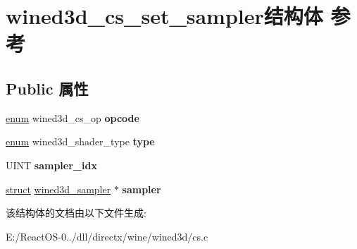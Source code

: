 \hypertarget{structwined3d__cs__set__sampler}{}\section{wined3d\+\_\+cs\+\_\+set\+\_\+sampler结构体 参考}
\label{structwined3d__cs__set__sampler}
\subsection*{Public 属性}
\begin{DoxyCompactItemize}
\item 
\mbox{\label{structwined3d__cs__set__sampler_aac800a9a600d52e8db6c5b51700b7a91}} 
\hyperlink{interfaceenum}{enum} wined3d\+\_\+cs\+\_\+op {\bfseries opcode}
\item 
\mbox{\label{structwined3d__cs__set__sampler_a1b6f90a5a6bad32c24e757a2b2ae310f}} 
\hyperlink{interfaceenum}{enum} wined3d\+\_\+shader\+\_\+type {\bfseries type}
\item 
\mbox{\label{structwined3d__cs__set__sampler_a8a703f062e1ba858ea5b96c08c5cc11c}} 
U\+I\+NT {\bfseries sampler\+\_\+idx}
\item 
\mbox{\label{structwined3d__cs__set__sampler_a1124c5ccbf08ac6b92741c400872aaa6}} 
\hyperlink{interfacestruct}{struct} \hyperlink{structwined3d__sampler}{wined3d\+\_\+sampler} $\ast$ {\bfseries sampler}
\end{DoxyCompactItemize}


该结构体的文档由以下文件生成\+:\begin{DoxyCompactItemize}
\item 
E\+:/\+React\+O\+S-\/0../dll/directx/wine/wined3d/cs.\+c\end{DoxyCompactItemize}
